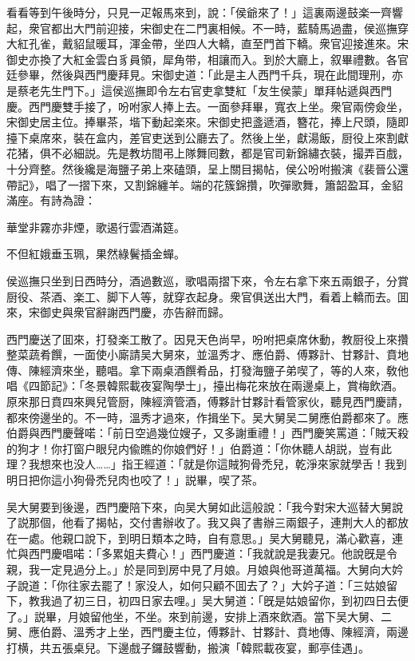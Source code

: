 看看等到午後時分，只見一疋報馬來到，說：「侯爺來了！」這裏兩邊鼓楽一齊響起，衆官都出大門前迎接，宋御史在二門裏相候。不一時，藍騎馬過盡，侯巡撫穿大紅孔雀，戴貂鼠暖耳，渾金帶，坐四人大轎，直至門首下轎。衆官迎接進來。宋御史亦換了大紅金雲白豸員領，犀角带，相讓而入。到於大廳上，叙畢禮數。各官廷參畢，然後與西門慶拜見。宋御史道：「此是主人西門千兵，現在此間理刑，亦是蔡老先生門下。」這侯巡撫即令左右官吏拿雙紅「友生侯蒙」單拜帖遞與西門慶。西門慶雙手接了，吩咐家人捧上去。一面參拜畢，寬衣上坐。衆官兩傍僉坐，宋御史居主位。捧畢茶，堦下動起楽來。宋御史把盞遞酒，簪花，捧上尺頭，隨即擡下桌席來，裝在盒内，差官吏送到公廳去了。然後上坐，獻湯飯，厨役上來割獻花猪，俱不必細説。先是教坊間弔上隊舞囘數，都是官司新錦繡衣裝，撮弄百戲，十分齊整。然後纔是海鹽子弟上來磕頭，呈上關目揭帖，侯公吩咐搬演《裴晉公還帶記》，唱了一摺下來，又割錦纏羊。端的花簇錦攢，吹彈歌舞，簫韶盈耳，金貂滿座。有詩為證：

\begin{myquote}
華堂非霧亦非煙，歌遏行雲酒滿筵。

不但紅娥垂玉珮，果然綠鬢插金蟬。
\end{myquote}

侯巡撫只坐到日西時分，酒過數巡，歌唱兩摺下來，令左右拿下來五兩銀子，分賞厨役、茶酒、楽工、脚下人等，就穿衣起身。衆官俱送出大門，看着上轎而去。囬來，宋御史與衆官辭謝西門慶，亦告辭而歸。

西門慶送了囬來，打發楽工散了。因見天色尚早，吩咐把桌席休動，教厨役上來攢整菜蔬肴饌，一面使小廝請吴大舅來，並溫秀才、應伯爵、傅夥計、甘夥計、賁地傳、陳經濟來坐，聽唱。拿下兩桌酒饌肴品，打發海鹽子弟喫了，等的人來，敎他唱《四節記》：「冬景韓熙載夜宴陶學士」，擡出梅花來放在兩邊桌上，賞梅飲酒。原來那日賁四來興兒管厨，陳經濟管酒，傅夥計甘夥計看管家伙，聽見西門慶請，都來傍邊坐的。不一時，溫秀才過來，作揖坐下。吴大舅吴二舅應伯爵都來了。應伯爵與西門慶聲喏：「前日空過幾位嫂子，又多謝重禮！」西門慶笑罵道：「賊天殺的狗才！你打窗户眼兒内偸瞧的你娘們好！」伯爵道：「你休聽人胡説，豈有此理？我想來也没人……」指王經道：「就是你這賊狗骨禿兒，乾淨來家就學舌！我到明日把你這小狗骨禿兒肉也咬了！」説畢，喫了茶。

吴大舅要到後邊，西門慶陪下來，向吴大舅如此這般說：「我今對宋大巡替大舅說了説那個，他看了揭帖，交付書辦收了。我又與了書辦三兩銀子，連荆大人的都放在一處。他親口說下，到明日類本之時，自有意思。」吴大舅聽見，滿心歡喜，連忙與西門慶唱喏：「多累姐夫費心！」西門慶道：「我就說是我妻兄。他說旣是令親，我一定見過分上。」於是同到房中見了月娘。月娘與他哥道萬福。大舅向大妗子說道：「你往家去罷了！家没人，如何只顧不囬去了？」大妗子道：「三姑娘留下，教我過了初三日，初四日家去哩。」吴大舅道：「旣是姑娘留你，到初四日去便了。」説畢，月娘留他坐，不坐。來到前邊，安排上酒來飲酒。當下吴大舅、二舅、應伯爵、溫秀才上坐，西門慶主位，傅夥計、甘夥計、賁地傳、陳經濟，兩邊打横，共五張桌兒。下邊戲子鑼鼓響動，搬演「韓熙載夜宴，郵亭佳遇」。

